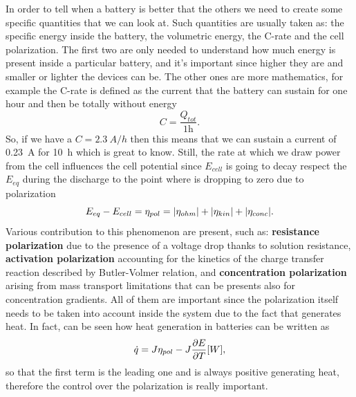 In order to tell when a battery is better that the others we need to create some specific quantities that we can look at. Such quantities are usually taken as: the specific energy inside the battery, the volumetric energy, the C-rate and the cell polarization. The first two are only needed to understand how much energy is present inside a particular battery, and it's important since higher they are and smaller or lighter the devices can be. The other ones are more mathematics, for example the C-rate is defined as the current that the battery can sustain for one hour and then be totally without energy
\begin{equation}
    C = \frac{Q_{tot}}{1\text{h}}.
\end{equation}
So, if we have a $C = \SI{2.3}{A/h}$ then this means that we can sustain a current of \SI{0.23}{A} for \SI{10}{\hour} which is great to know. Still, the rate at which we draw power from the cell influences the cell potential since $E_{cell}$ is going to decay respect the $E_{eq}$ during the discharge to the point where is dropping to zero due to polarization
\begin{equation}
    E_{eq} - E_{cell} = \eta_{pol} = \abs{\eta_{ohm}} + \abs{\eta_{kin}} + \abs{\eta_{conc}}.
\end{equation}
Various contribution to this phenomenon are present, such as: \textbf{resistance polarization} due to the presence of a voltage drop thanks to solution resistance, \textbf{activation polarization} accounting for the kinetics of the charge transfer reaction described by Butler-Volmer relation, and \textbf{concentration polarization} arising from mass transport limitations that can be presents also for concentration gradients. All of them are important since the polarization itself needs to be taken into account inside the system due to the fact that generates heat. In fact, can be seen how heat generation in batteries can be written as
\begin{equation}
    \dot{q} = J\eta_{pol} - J\pdv{E}{T}[W],
\end{equation}
so that the first term is the leading one and is always positive generating heat, therefore the control over the polarization is really important.